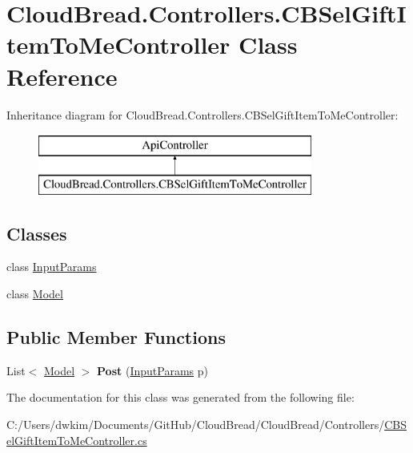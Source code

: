 \hypertarget{class_cloud_bread_1_1_controllers_1_1_c_b_sel_gift_item_to_me_controller}{}\section{Cloud\+Bread.\+Controllers.\+C\+B\+Sel\+Gift\+Item\+To\+Me\+Controller Class Reference}
\label{class_cloud_bread_1_1_controllers_1_1_c_b_sel_gift_item_to_me_controller}
Inheritance diagram for Cloud\+Bread.\+Controllers.\+C\+B\+Sel\+Gift\+Item\+To\+Me\+Controller\+:\begin{figure}[H]
\begin{center}
\leavevmode
\includegraphics[height=2.000000cm]{class_cloud_bread_1_1_controllers_1_1_c_b_sel_gift_item_to_me_controller}
\end{center}
\end{figure}
\subsection*{Classes}
\begin{DoxyCompactItemize}
\item 
class \hyperlink{class_cloud_bread_1_1_controllers_1_1_c_b_sel_gift_item_to_me_controller_1_1_input_params}{Input\+Params}
\item 
class \hyperlink{class_cloud_bread_1_1_controllers_1_1_c_b_sel_gift_item_to_me_controller_1_1_model}{Model}
\end{DoxyCompactItemize}
\subsection*{Public Member Functions}
\begin{DoxyCompactItemize}
\item 
List$<$ \hyperlink{class_cloud_bread_1_1_controllers_1_1_c_b_sel_gift_item_to_me_controller_1_1_model}{Model} $>$ {\bfseries Post} (\hyperlink{class_cloud_bread_1_1_controllers_1_1_c_b_sel_gift_item_to_me_controller_1_1_input_params}{Input\+Params} p)\hypertarget{class_cloud_bread_1_1_controllers_1_1_c_b_sel_gift_item_to_me_controller_a3cb5109a3d17222ee654657916ccf126}{}\label{class_cloud_bread_1_1_controllers_1_1_c_b_sel_gift_item_to_me_controller_a3cb5109a3d17222ee654657916ccf126}

\end{DoxyCompactItemize}


The documentation for this class was generated from the following file\+:\begin{DoxyCompactItemize}
\item 
C\+:/\+Users/dwkim/\+Documents/\+Git\+Hub/\+Cloud\+Bread/\+Cloud\+Bread/\+Controllers/\hyperlink{_c_b_sel_gift_item_to_me_controller_8cs}{C\+B\+Sel\+Gift\+Item\+To\+Me\+Controller.\+cs}\end{DoxyCompactItemize}
